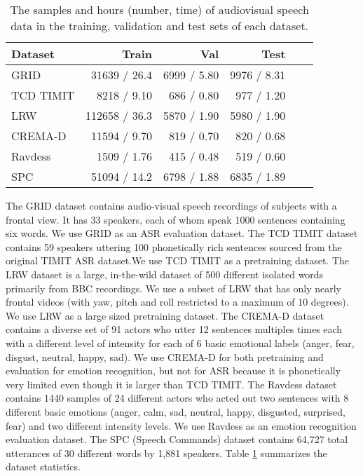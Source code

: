 \documentclass{article}
\begin{document}
\begin{table}[t]
\begin{center}
\tabcolsep=0.06cm
\small
\begin{tabular}{|l|r|r|r|r|r|}
\hline
Dataset & Train & Val &  Test \\
\hline
GRID   & 31639 / 26.4 & 6999 / 5.80 & 9976 / 8.31 \\
TCD TIMIT   & 8218 / 9.10 & 686 / 0.80 &977 / 1.20 \\
LRW & 112658 / 36.3 & 5870 / 1.90& 5980 / 1.90\\
CREMA-D & 11594 / 9.70 & 819 / 0.70 & 820 / 0.68 \\
Ravdess & 1509 / 1.76 & 415 / 0.48 & 519 / 0.60 \\
SPC & 51094 / 14.2 & 6798 / 1.88 & 6835 / 1.89 \\
\hline
\end{tabular}
\vspace{-0.25cm}
\end{center}
\caption{The samples and hours (number, time) of audiovisual speech data in the training, validation and test sets of each dataset.}
\label{tab:Subjects}
\end{table}

The GRID dataset \cite{cooke2006audio} contains audio-visual speech recordings of subjects with a frontal view. It has 33 speakers, each of whom speak 1000 sentences containing six words. We use GRID as an ASR evaluation dataset. The TCD TIMIT \cite{harte2015tcd} dataset contains 59 speakers uttering 100 phonetically rich sentences sourced from the original TIMIT ASR dataset.We use TCD TIMIT as a pretraining dataset. The LRW dataset \cite{chung2016lip} is a large, in-the-wild dataset of 500 different isolated words primarily from BBC recordings. We use a subset of LRW that has only nearly frontal videos (with yaw, pitch and roll restricted to a maximum of 10 degrees). We use LRW as a large sized pretraining dataset. The CREMA-D dataset \cite{cao2014crema} contains a diverse set of 91 actors who utter 12 sentences multiples times each with a different level of intensity for each of 6 basic emotional labels (anger, fear, disgust, neutral, happy, sad). We use CREMA-D for both pretraining and evaluation for emotion recognition, but not for ASR because it is phonetically very limited even though it is larger than TCD TIMIT. The Ravdess dataset \cite{livingstone2018ryerson} contains 1440 samples of 24 different actors who acted out two sentences with 8 different basic emotions (anger, calm, sad, neutral, happy, disgusted, surprised, fear) and two different intensity levels. We use Ravdess as an emotion recognition evaluation dataset. The SPC (Speech Commands) dataset \cite{warden2018speech} contains 64,727 total utterances of 30 different words by 1,881 speakers. Table \ref{tab:Subjects} summarizes the dataset statistics.
\end{document}
